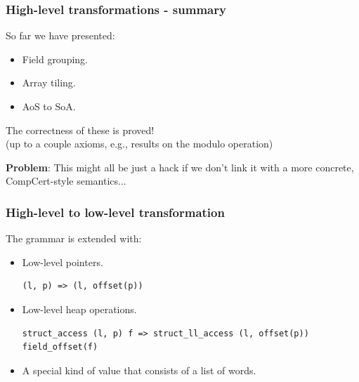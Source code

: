 \begin{frame}[fragile]
\frametitle{High-level transformations - summary}

So far we have presented:

\vspace{1em}
\begin{itemize}
	\setlength\itemsep{1.5em}
	\item Field grouping.
	\item Array tiling.
	\item AoS to SoA.
\end{itemize}

\bigskip \pause

The correctness of these is proved! \\ %
(up to a couple axioms, e.g., results on the modulo operation)

\bigskip \pause

\textbf{Problem}: This might all be just a hack if we don't link it with a more concrete, CompCert-style semantics...

\end{frame}


\begin{frame}[fragile]
\frametitle{High-level to low-level transformation}

The grammar is extended with:

\vspace{1em}
\begin{itemize}
	\setlength\itemsep{1.5em}
	\item Low-level pointers.
\begin{Verbatim}[fontsize=\scriptsize]
(l, p) => (l, offset(p))
\end{Verbatim}
	\item Low-level heap operations.
\begin{Verbatim}[fontsize=\scriptsize]
struct_access (l, p) f => struct_ll_access (l, offset(p)) field_offset(f)
\end{Verbatim}
	\item A special kind of value that consists of a list of words.
\end{itemize}

\end{frame}


